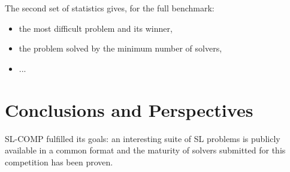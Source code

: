 \documentclass[twoside,11pt]{article}
\begin{document}
The second set of statistics gives, for the full benchmark:
\begin{itemize}
\item the most difficult problem and its winner,
\item the problem solved by the minimum number of solvers,
\item ...
\end{itemize}



\section{Conclusions and Perspectives}

SL-COMP fulfilled its goals:
an interesting suite of SL problems is publicly available in a common format and
the maturity of solvers submitted for this competition has been proven.
\end{document}
